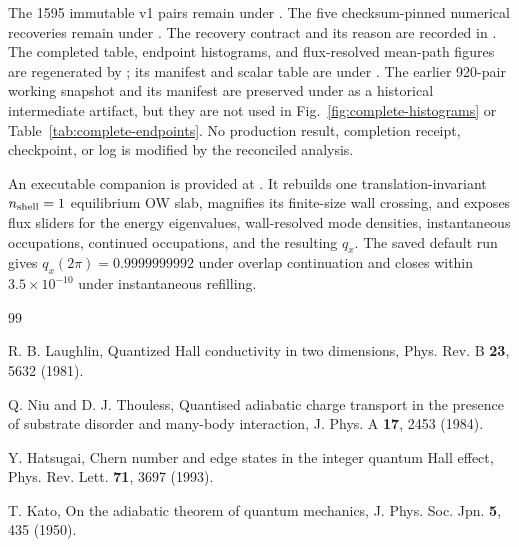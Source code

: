 \documentclass[aps,prb,twocolumn,floatfix,nofootinbib,superscriptaddress]{revtex4-2}
\begin{document}
The 1595 immutable v1 pairs remain under
.  The five
checksum-pinned numerical recoveries remain under
.
The recovery contract and its reason are recorded in
.  The completed table, endpoint histograms, and flux-resolved mean-path
figures are regenerated by
; its manifest and scalar
table are under
.
The earlier 920-pair working snapshot and its manifest are preserved under
 as a historical intermediate artifact,
but they are not used in Fig.~\ref{fig:complete-histograms} or
Table~\ref{tab:complete-endpoints}.  No production result, completion receipt,
checkpoint, or log is modified by the reconciled analysis.

An executable companion is provided at
.
It rebuilds one translation-invariant $n_{\rm shell}=1$ equilibrium OW slab,
magnifies its finite-size wall crossing, and exposes flux sliders for the
energy eigenvalues, wall-resolved mode densities, instantaneous occupations,
continued occupations, and the resulting $q_x$.  The saved default run gives
$q_x(2\pi)=0.9999999992$ under overlap continuation and closes within
$3.5\times10^{-10}$ under instantaneous refilling.

\begin{thebibliography}{99}

R. B. Laughlin, Quantized Hall conductivity in two dimensions,
Phys. Rev. B \textbf{23}, 5632 (1981).

Q. Niu and D. J. Thouless, Quantised adiabatic charge transport in the
presence of substrate disorder and many-body interaction,
J. Phys. A \textbf{17}, 2453 (1984).

Y. Hatsugai, Chern number and edge states in the integer quantum Hall effect,
Phys. Rev. Lett. \textbf{71}, 3697 (1993).

T. Kato, On the adiabatic theorem of quantum mechanics,
J. Phys. Soc. Jpn. \textbf{5}, 435 (1950).

\end{thebibliography}
\end{document}
